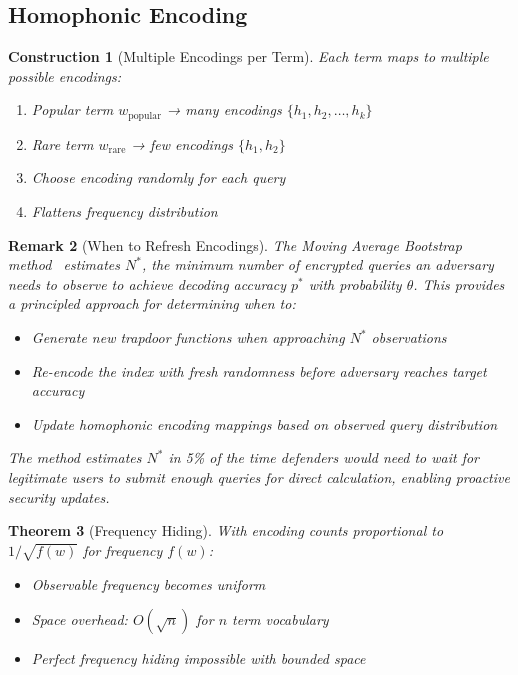 \documentclass[11pt,final,hidelinks]{article}
\newtheorem{theorem}{Theorem}[section]
\newtheorem{remark}[theorem]{Remark}
\newtheorem{construction}[theorem]{Construction}
\begin{document}
\subsection{Homophonic Encoding}

\begin{construction}[Multiple Encodings per Term]
Each term maps to multiple possible encodings:
\begin{enumerate}
    \item Popular term $w_{\text{popular}}$ → many encodings $\{h_1, h_2, \ldots, h_k\}$
    \item Rare term $w_{\text{rare}}$ → few encodings $\{h_1, h_2\}$
    \item Choose encoding randomly for each query
    \item Flattens frequency distribution
\end{enumerate}
\end{construction}

\begin{remark}[When to Refresh Encodings]
The Moving Average Bootstrap method~\cite{towell2016estimating} estimates $N^*$, the minimum number of encrypted queries an adversary needs to observe to achieve decoding accuracy $p^*$ with probability $\theta$. This provides a principled approach for determining when to:
\begin{itemize}
    \item Generate new trapdoor functions when approaching $N^*$ observations
    \item Re-encode the index with fresh randomness before adversary reaches target accuracy
    \item Update homophonic encoding mappings based on observed query distribution
\end{itemize}
The method estimates $N^*$ in 5\% of the time defenders would need to wait for legitimate users to submit enough queries for direct calculation, enabling proactive security updates.
\end{remark}

\begin{theorem}[Frequency Hiding]
With encoding counts proportional to $1/\sqrt{f(w)}$ for frequency $f(w)$:
\begin{itemize}
    \item Observable frequency becomes uniform
    \item Space overhead: $O(\sqrt{n})$ for $n$ term vocabulary
    \item Perfect frequency hiding impossible with bounded space
\end{itemize}
\end{theorem}
\end{document}

